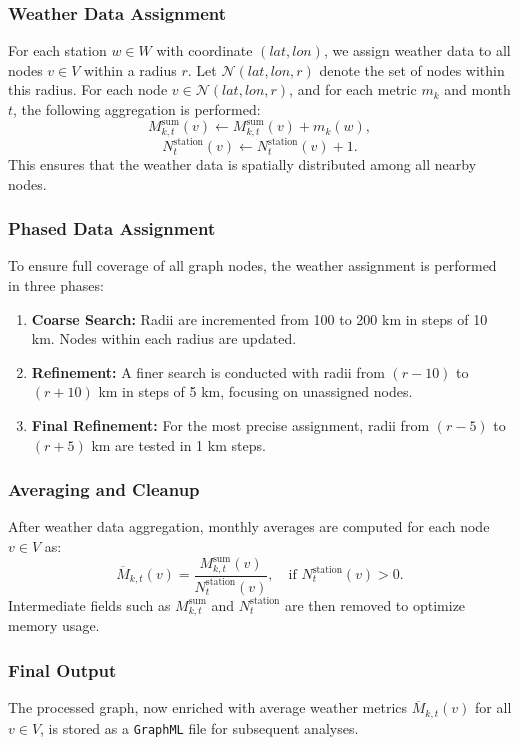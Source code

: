 \documentclass[sigplan,screen]{acmart}
\begin{document}
\subsubsection{Weather Data Assignment}
For each station \( w \in W \) with coordinate \((lat, lon)\), we assign weather data to all nodes \( v \in V \) within a radius \( r \). Let \( \mathcal{N}(lat, lon, r) \) denote the set of nodes within this radius. For each node \( v \in \mathcal{N}(lat, lon, r) \), and for each metric \( m_k \) and month \( t \), the following aggregation is performed:
\[
M_{k,t}^\text{sum}(v) \leftarrow M_{k,t}^\text{sum}(v) + m_k(w),
\]
\[
N_t^\text{station}(v) \leftarrow N_t^\text{station}(v) + 1.
\]
This ensures that the weather data is spatially distributed among all nearby nodes.

\subsubsection{Phased Data Assignment}
To ensure full coverage of all graph nodes, the weather assignment is performed in three phases:
\begin{enumerate}
    \item \textbf{Coarse Search:} Radii are incremented from 100 to 200 km in steps of 10 km. Nodes within each radius are updated.
    \item \textbf{Refinement:} A finer search is conducted with radii from \((r-10)\) to \((r+10)\) km in steps of 5 km, focusing on unassigned nodes.
    \item \textbf{Final Refinement:} For the most precise assignment, radii from \((r-5)\) to \((r+5)\) km are tested in 1 km steps.
\end{enumerate}

\subsubsection{Averaging and Cleanup}
After weather data aggregation, monthly averages are computed for each node \( v \in V \) as:
\[
\overline{M}_{k,t}(v) = \frac{M_{k,t}^\text{sum}(v)}{N_t^\text{station}(v)}, \quad \text{if } N_t^\text{station}(v) > 0.
\]
Intermediate fields such as \( M_{k,t}^\text{sum} \) and \( N_t^\text{station} \) are then removed to optimize memory usage.

\subsubsection{Final Output}
The processed graph, now enriched with average weather metrics \(\overline{M}_{k,t}(v)\) for all \(v \in V\), is stored as a \texttt{GraphML} file for subsequent analyses.
\end{document}
